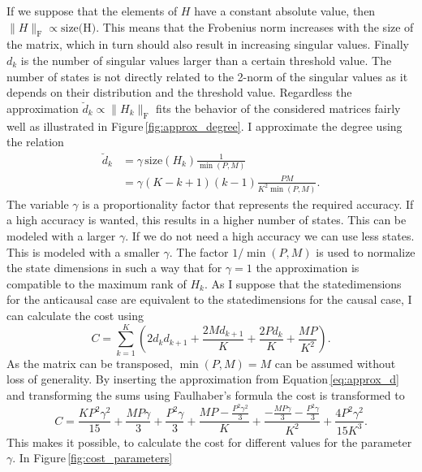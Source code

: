 \documentclass[doctype=mastersthesis,BCOR=15mm,biblatex]{ldvbook}%
\begin{document}
If we suppose that the elements of $H$ have a constant absolute value, then $\|H\|_\text{F} \propto \text{size(H)}$.
This means that the Frobenius norm increases with the size of the matrix, which in turn should also result in increasing singular values.
Finally $d_k$ is the number of singular values larger than a certain threshold value.
The number of states is not directly related to the 2-norm of the singular values as it depends on their distribution and the threshold value.%
Regardless the approximation $\breve{d}_k \propto \|H_k\|_\text{F}$ fits the behavior of the considered matrices fairly well as illustrated in Figure\,\ref{fig:approx_degree}.
I approximate the degree using the relation
\begin{align}\label{eq:approx_d}
	\breve{d}_k 
	&= \gamma \,\text{size}(H_k) \frac{1}{\min(P,M)}\\
	&= \gamma (K-k+1)(k-1)\frac{PM}{K^2\min(P,M)}.
\end{align}
The variable $\gamma$ is a proportionality factor that represents the required accuracy. 
If a high accuracy is wanted, this results in a higher number of states. 
This can be modeled with a larger $\gamma$.
If we do not need a high accuracy we can use less states.
This is modeled with a smaller $\gamma$.
The factor $1/\min(P,M)$ is used to normalize the state dimensions in such a way that for $\gamma = 1$ the approximation is compatible to the maximum rank of $H_k$. 
As I suppose that the statedimensions for the anticausal case are equivalent to the statedimensions for the causal case, I can calculate the cost using
\begin{equation}
C = \sum_{k=1}^{K} \left(2 d_{k} d_{k+1} + \frac{2 M d_{k+1}}{K} + \frac{2 P d_{k}}{K} + \frac{M P}{K^{2}}\right)
.
\end{equation}
As the matrix can be transposed, $\min(P,M)=M$ can be assumed without loss of generality.
By inserting the approximation from Equation\,\ref{eq:approx_d} and transforming the sums using Faulhaber's formula \cite{knuth_johann_1993} the cost is transformed to
\begin{equation}\label{eq:cost_of_K}
C = \frac{K P^{2} \gamma^{2}}{15} + \frac{M P \gamma}{3} + \frac{P^{2} \gamma}{3} + \frac{M P - \frac{P^{2} \gamma^{2}}{3}}{K} + \frac{- \frac{M P \gamma}{3} - \frac{P^{2} \gamma}{3}}{K^{2}} + \frac{4 P^{2} \gamma^{2}}{15 K^{3}}
.
\end{equation}
This makes it possible, to calculate the cost for different values for the parameter $\gamma$.
In Figure\,\ref{fig:cost_parameters} 
\end{document}
